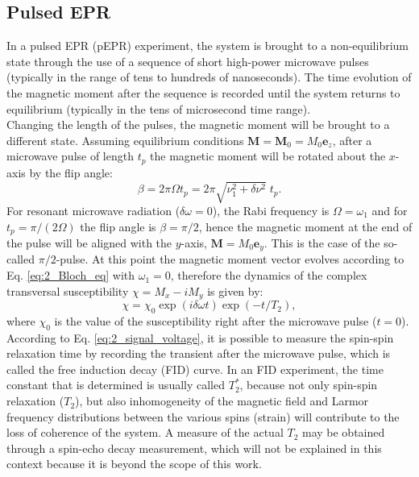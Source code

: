 \documentclass[a4paper]{book}
\newcommand{\mb}{\mathbf}
\newcommand{\mbe}{\mathbf{e}}
\begin{document}
	\subsection{Pulsed EPR}
	In a pulsed EPR (pEPR) experiment, the system is brought to a non-equilibrium state through the use of a sequence of short high-power microwave pulses (typically in the range of tens to hundreds of nanoseconds). The time evolution of the magnetic moment after the sequence is recorded until the system returns to equilibrium (typically in the tens of microsecond time range).\\
	Changing the length of the pulses, the magnetic moment will be brought to a different state. Assuming equilibrium conditions $\mb{M} = \mb{M}_0 = M_0\mbe_z$, after a microwave pulse of length $t_p$ the magnetic moment will be rotated about the $x$-axis by the flip angle:
	\begin{equation}
		\label{eq:2_flip_angle}
		\beta = 2\pi\Omega t_p = 2\pi\sqrt{\nu_1^2 + \delta\nu^2}\;t_p.
	\end{equation}
	For resonant microwave radiation ($\delta\omega = 0$), the Rabi frequency is $\Omega = \omega_1$ and for $t_p = \pi/(2\Omega)$ the flip angle is $\beta = \pi/2$, hence the magnetic moment at the end of the pulse will be aligned with the $y$-axis, $\textbf{M} = M_0\textbf{e}_{y}$. This is the case of the so-called $\pi/2$-pulse. At this point the magnetic moment vector evolves according to Eq. \eqref{eq:2_Bloch_eq} with $\omega_1 = 0$, therefore the dynamics of the complex transversal susceptibility $\chi= M_x - iM_y$ is given by:
	\begin{equation}
		\label{eq:2_dynamics_of_susceptibility}
		\chi = \chi_0\exp(i\delta\omega t)\exp(-t/T_2),
	\end{equation}
	where $\chi_0$ is the value of the susceptibility right after the microwave pulse ($t=0$). According to Eq. \eqref{eq:2_signal_voltage}, it is possible to measure the spin-spin relaxation time by recording the transient after the microwave pulse, which is called the free induction decay (FID) curve. In an FID experiment, the time constant that is determined is usually called $T_2^*$, because not only spin-spin relaxation ($T_2$), but also inhomogeneity of the magnetic field and Larmor frequency distributions between the various spins (strain) will contribute to the loss of coherence of the system. A measure of the actual $T_2$ may be obtained through a spin-echo decay measurement, which will not be explained in this context because it is beyond the scope of this work.\\
\end{document}
